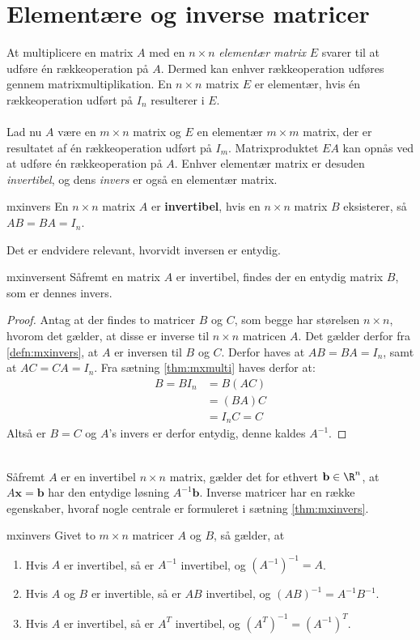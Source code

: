 \section{Elementære og inverse matricer}
At multiplicere en matrix $A$ med en $n \times n$ \textit{elementær matrix} $E$ svarer til at udføre én rækkeoperation på $A$. 
Dermed kan enhver rækkeoperation udføres gennem matrixmultiplikation. 
En $n \times n$ matrix $E$ er elementær, hvis én rækkeoperation udført på $I_n$ resulterer i $E$. 
\\\\
Lad nu $A$ være en $m \times n$ matrix og $E$ en elementær $m \times m$ matrix, der er resultatet af én rækkeoperation udført på $I_m$. 
Matrixproduktet $EA$ kan opnås ved at udføre én rækkeoperation på $A$. 
Enhver elementær matrix er desuden \textit{invertibel}, og dens \textit{invers} er også en elementær matrix. 
%
\begin{defn}{}{mxinvers}
En $n \times n$ matrix $A$ er \textbf{invertibel}, hvis en $n \times n$ matrix $B$ eksisterer, så $AB=BA=I_n$. 
\end{defn}
\noindent
%
Det er endvidere relevant, hvorvidt inversen er entydig.
\begin{thm}{}{mxinversent}
Såfremt en matrix $A$ er invertibel, findes der en entydig matrix $B$, som er dennes invers.
\end{thm}
%
\begin{proof}
Antag at der findes to matricer  $B$ og $C$, som begge har størelsen $n \times n$, hvorom det gælder, at disse er inverse til $n \times n$ matricen $A$.
Det gælder derfor fra \ref{defn:mxinvers}, at $A$ er inversen til $B$ og $C$.
Derfor haves at $AB=BA=I_{n}$, samt at $AC=CA=I_{n}$. 
Fra sætning \ref{thm:mxmulti} haves derfor at:
\begin{align*}
B=BI_n&=B(AC) \\
&=(BA)C \\
&=I_nC=C
\end{align*} 
Altså er $B=C$ og $A$'s invers er derfor entydig, denne kaldes $A^{-1}$.
\end{proof} \\
%
Såfremt $A$ er en invertibel $n \times n$ matrix, gælder det for ethvert $\mathbf{b} \in \R^n$, at $A\textbf{x}=\mathbf{b}$ har den entydige løsning $A^{-1}\mathbf{b}$.
Inverse matricer har en række egenskaber, hvoraf nogle centrale er formuleret i sætning \ref{thm:mxinvers}. 
%
\begin{thm}{}{mxinvers}
Givet to $m \times n$ matricer $A$ og $B$, så gælder, at
\begin{enumerate}[label=(\alph*)]
\item Hvis $A$ er invertibel, så er $A^{-1}$ invertibel, og $(A^{-1})^{-1}=A$.
\item Hvis $A$ og $B$ er invertible, så er $AB$ invertibel, og $(AB)^{-1}=A^{-1}B^{-1}$.
\item Hvis $A$ er invertibel, så er $A^T$ invertibel, og $(A^T)^{-1}=(A^{-1})^T$.
\end{enumerate}
\end{thm}
